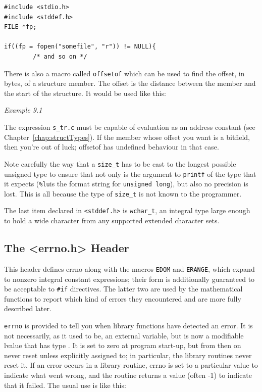    \begin{Verbatim}
#include <stdio.h>
#include <stddef.h>
FILE *fp;

if((fp = fopen("somefile", "r")) != NULL){
        /* and so on */
\end{Verbatim}

   There is also a macro called \texttt{offsetof} which can be  used  to
    find  the  offset,  in  bytes,  of  a structure member.  The
    offset is the distance between the member and the  start  of
    the structure.  It would be used like this:


   \begin{center}\textit{Example 9.1}\end{center}


   The expression \texttt{s\_tr.c} must be capable of  evaluation  as  an
   address  constant  (see  Chapter~\ref{chap:structTypes}).
   If  the member whose
    offset you want is a bitfield,  then  you're  out  of  luck;
    offsetof has undefined behaviour in that case.


   Note carefully the way that a \texttt{size\_t} has to be cast  to  the
    longest  possible  unsigned  type to ensure that not only is the argument
    to \texttt{printf} of the type that it expects (\texttt{\%lu}is
    the  format string for \texttt{unsigned long}), but also no precision
    is lost.  This is all because the  type  of  \texttt{size\_t}  is  not
    known to the programmer.


   The last item declared in \texttt{<stddef.h>} is
    \texttt{wchar\_t}, an integral type large enough to hold a wide
    character from any supported extended character sets.


  

  \subsection{The <errno.h> Header}
   

   This header defines errno along with the macros \texttt{EDOM} and
    \texttt{ERANGE}, which expand to nonzero integral constant
    expressions; their form is additionally guaranteed to be
    acceptable to \texttt{\#if} directives.  The latter two are used by
    the mathematical functions to report which kind of errors
    they encountered and are more fully described later.


   \texttt{errno} is provided to tell you when library functions have
    detected an error.  It is not necessarily, as it used to be,
    an external variable, but is now a modifiable lvalue that
    has type \kint.  It is set to zero at program start-up, but
    from then on never reset unless explicitly assigned to; in
    particular, the library routines never reset it.  If an
    error occurs in a library routine, errno is set to a
    particular value to indicate what went wrong, and the
    routine returns a value (often -1) to indicate that it
    failed.  The usual use is like this:


